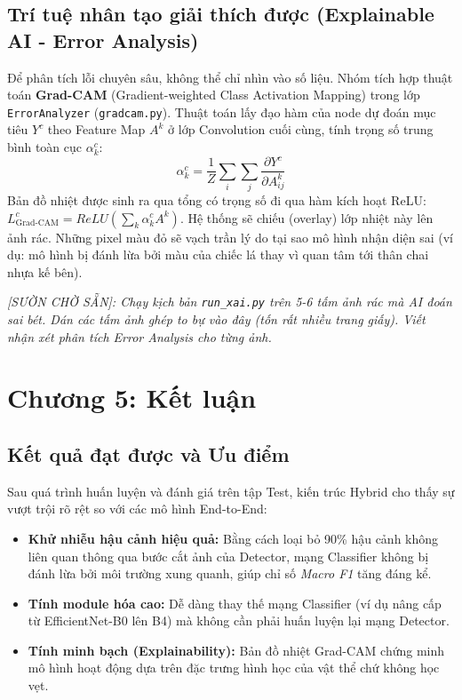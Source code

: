 \documentclass[12pt, a4paper]{article}
\begin{document}
\subsection{Trí tuệ nhân tạo giải thích được (Explainable AI - Error Analysis)}
Để phân tích lỗi chuyên sâu, không thể chỉ nhìn vào số liệu. Nhóm tích hợp thuật toán \textbf{Grad-CAM} (Gradient-weighted Class Activation Mapping) trong lớp \texttt{ErrorAnalyzer} (\texttt{gradcam.py}). Thuật toán lấy đạo hàm của node dự đoán mục tiêu $Y^c$ theo Feature Map $A^k$ ở lớp Convolution cuối cùng, tính trọng số trung bình toàn cục $\alpha_k^c$:
\begin{equation}
    \alpha_k^c = \frac{1}{Z} \sum_i \sum_j \frac{\partial Y^c}{\partial A_{ij}^k}
\end{equation}
Bản đồ nhiệt được sinh ra qua tổng có trọng số đi qua hàm kích hoạt ReLU: $L_{\text{Grad-CAM}}^c = ReLU\left(\sum_k \alpha_k^c A^k\right)$. Hệ thống sẽ chiếu (overlay) lớp nhiệt này lên ảnh rác. Những pixel màu đỏ sẽ vạch trần lý do tại sao mô hình nhận diện sai (ví dụ: mô hình bị đánh lừa bởi màu của chiếc lá thay vì quan tâm tới thân chai nhựa kế bên).

\begin{tcolorbox}[colback=yellow!10, colframe=red!75!black, title=YÊU CẦU BỔ SUNG ĐỂ ĐẠT 50 TRANG: ẢNH BẢN ĐỒ NHIỆT XAI GRAD-CAM]
\textit{[SƯỜN CHỜ SẴN]: Chạy kịch bản \texttt{run\_xai.py} trên 5-6 tấm ảnh rác mà AI đoán sai bét. Dán các tấm ảnh ghép to bự vào đây (tốn rất nhiều trang giấy). Viết nhận xét phân tích Error Analysis cho từng ảnh.}
\end{tcolorbox}

\section{Chương 5: Kết luận}
\subsection{Kết quả đạt được và Ưu điểm}
Sau quá trình huấn luyện và đánh giá trên tập Test, kiến trúc Hybrid cho thấy sự vượt trội rõ rệt so với các mô hình End-to-End:
\begin{itemize}
    \item \textbf{Khử nhiễu hậu cảnh hiệu quả:} Bằng cách loại bỏ 90\% hậu cảnh không liên quan thông qua bước cắt ảnh của Detector, mạng Classifier không bị đánh lừa bởi môi trường xung quanh, giúp chỉ số \textit{Macro F1} tăng đáng kể.
    \item \textbf{Tính module hóa cao:} Dễ dàng thay thế mạng Classifier (ví dụ nâng cấp từ EfficientNet-B0 lên B4) mà không cần phải huấn luyện lại mạng Detector.
    \item \textbf{Tính minh bạch (Explainability):} Bản đồ nhiệt Grad-CAM chứng minh mô hình hoạt động dựa trên đặc trưng hình học của vật thể chứ không học vẹt.
\end{itemize}
\end{document}
